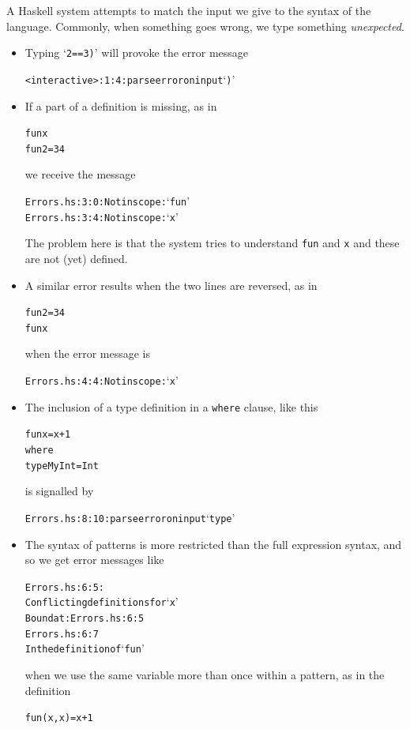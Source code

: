 A Haskell system attempts to match the input we give to the
syntax of the language. Commonly, when something goes wrong, we type
something \emph{unexpected}. 
\begin{itemize}

\item
Typing `\texttt{2==3)}' will provoke the error
message
\begin{alltt}
<interactive>:1:4: parse error on input `)'
\end{alltt}
\item
If a part of a definition is missing, as in
\begin{alltt}
fun x
fun 2 = 34
\end{alltt}
we receive the message
\begin{alltt}
Errors.hs:3:0: Not in scope: `fun'
Errors.hs:3:4: Not in scope: `x'
\end{alltt}
The problem here is that the system tries to understand \texttt{fun} and \texttt{x} and these are not (yet) defined. 

\item
A similar error results when the two lines are reversed, as in 
\begin{alltt}
fun 2 = 34
fun x
\end{alltt}
when the error message is 
\begin{alltt}
Errors.hs:4:4: Not in scope: `x'
\end{alltt}

\item
The inclusion of a type definition in a \texttt{where}
clause, like this
\begin{alltt}
fun x = x+1
        where
          type MyInt = Int
\end{alltt}
is signalled by 
\begin{alltt}
Errors.hs:8:10: parse error on input `type'
\end{alltt}

\item
The syntax of patterns is more restricted
than the full expression syntax, and so we get error messages like
\begin{alltt}
Errors.hs:6:5:
    Conflicting definitions for `x'
    Bound at: Errors.hs:6:5
              Errors.hs:6:7
    In the definition of `fun'
\end{alltt}
when we use the same variable more than once within a pattern, as in the definition
\begin{alltt}
fun (x,x) = x+1
\end{alltt}


\end{itemize}

